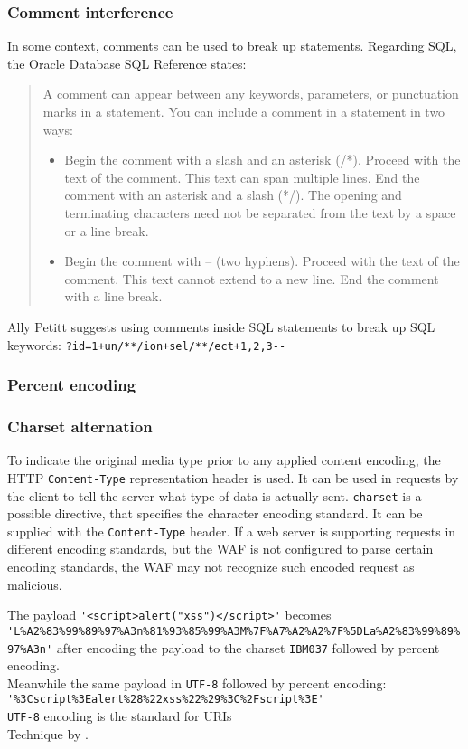 \subsubsection{Comment interference}
In some context, comments can be used to break up statements. Regarding SQL, the Oracle Database SQL Reference states:
\begin{quote}
	A comment can appear between any keywords, parameters, or punctuation marks in a statement. You can include a comment in a statement in two ways:
	\begin{itemize}
		\item Begin the comment with a slash and an asterisk (/*). Proceed with the text of the comment. This text can span multiple lines. End the comment with an asterisk and a slash (*/). The opening and terminating characters need not be separated from the text by a space or a line break.
		\item Begin the comment with -- (two hyphens). Proceed with the text of the comment. This text cannot extend to a new line. End the comment with a line break.
	\end{itemize}
	\cite{oracle/sqlcomments}
\end{quote}
Ally Petitt suggests using comments inside SQL statements to break up SQL keywords: \verb|?id=1+un/**/ion+sel/**/ect+1,2,3--| \cite{medium/allypetitt}


\subsubsection{Percent encoding}


\subsubsection{Charset alternation}
To indicate the original media type prior to any applied content encoding, the HTTP \verb|Content-Type| representation header is used.
It can be used in requests by the client to tell the server what type of data is actually sent.
\verb|charset| is a possible directive, that specifies the character encoding standard. 
It can be supplied with the \verb|Content-Type| header. \cite{http/contenttype}
If a web server is supporting requests in different encoding standards, but the WAF is not configured to parse certain encoding standards, the WAF may not recognize such encoded request as malicious.

The payload \verb|'<script>alert("xss")</script>'| becomes \\ 
\verb|'L%A2%83%99%89%97%A3n%81%93%85%99%A3M%7F%A7%A2%A2%7F%5DLa%A2%83%99%89%97%A3n'|
after encoding the payload to the charset \verb|IBM037| followed by percent encoding. \\ 
Meanwhile the same payload in \verb|UTF-8| followed by percent encoding: \\
\verb|'%3Cscript%3Ealert%28%22xss%22%29%3C%2Fscript%3E'| \\
\verb|UTF-8| encoding is the standard for URIs \cite{rfc3986} \\
Technique by \cite{medium/allypetitt}. 


